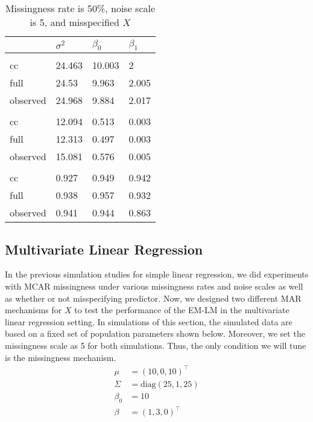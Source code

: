 \documentclass[
  twocolumn]{article}
\begin{document}
\begin{table}[h]
\caption{Missingness rate is 50\%, noise scale is 5, and misspecified $X$}
\begingroup\fontsize{7}{9}\selectfont

\begin{tabu} to 
\toprule
 & $\sigma^2$ & $\beta_0$ & $\beta_1$\\
\midrule
\addlinespace[0.3em]
\\
\hspace{1em}cc & 24.463 & 10.003 & 2\\
\hspace{1em}full & 24.53 & 9.963 & 2.005\\
\hspace{1em}observed & 24.968 & 9.884 & 2.017\\
\addlinespace[0.3em]
\\
\hspace{1em}cc & 12.094 & 0.513 & 0.003\\
\hspace{1em}full & 12.313 & 0.497 & 0.003\\
\hspace{1em}observed & 15.081 & 0.576 & 0.005\\
\addlinespace[0.3em]
\\
\hspace{1em}cc & 0.927 & 0.949 & 0.942\\
\hspace{1em}full & 0.938 & 0.957 & 0.932\\
\hspace{1em}observed & 0.941 & 0.944 & 0.863\\
\bottomrule
\end{tabu}
\endgroup{}
\end{table}

\hypertarget{multivariate-linear-regression}{%
\subsection{Multivariate Linear
Regression}\label{multivariate-linear-regression}}

In the previous simulation studies for simple linear regression, we did
experiments with MCAR missingness under various missingness rates and
noise scales as well as whether or not misspecifying predictor. Now, we
designed two different MAR mechanisms for \(X\) to test the performance
of the EM-LM in the multivariate linear regression setting. In
simulations of this section, the simulated data are based on a fixed set
of population parameters shown below. Moreover, we set the missingness
scale as 5 for both simulations. Thus, the only condition we will tune
is the missingness mechanism. \[
\begin{aligned}
\mu &= (10, 0, 10)^{\top} \\
\Sigma &= \text{diag}(25, 1, 25) \\
\beta_0 &= 10 \\
\beta &= (1, 3, 0)^{\top}
\end{aligned}
\]
\end{document}
